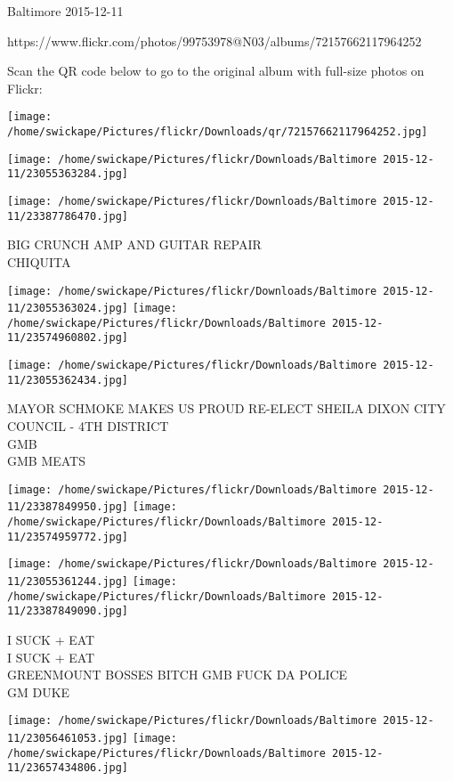 \documentclass[10pt,letterpaper]{article}
\begin{document}
Baltimore 2015-12-11

https://www.flickr.com/photos/99753978@N03/albums/72157662117964252

Scan the QR code below to go to the original album with full-size photos on Flickr:

\texttt{[image: /home/swickape/Pictures/flickr/Downloads/qr/72157662117964252.jpg]}
\pagebreak

\texttt{[image: /home/swickape/Pictures/flickr/Downloads/Baltimore 2015-12-11/23055363284.jpg]}

\vspace{0.25in}
\texttt{[image: /home/swickape/Pictures/flickr/Downloads/Baltimore 2015-12-11/23387786470.jpg]}

BIG CRUNCH AMP AND GUITAR REPAIR\\
CHIQUITA
\pagebreak

\texttt{[image: /home/swickape/Pictures/flickr/Downloads/Baltimore 2015-12-11/23055363024.jpg]}
\texttt{[image: /home/swickape/Pictures/flickr/Downloads/Baltimore 2015-12-11/23574960802.jpg]}

\vspace{0.25in}
\texttt{[image: /home/swickape/Pictures/flickr/Downloads/Baltimore 2015-12-11/23055362434.jpg]}

MAYOR SCHMOKE MAKES US PROUD RE{-}ELECT SHEILA DIXON CITY COUNCIL {-} 4TH DISTRICT\\
GMB\\
GMB MEATS
\pagebreak

\texttt{[image: /home/swickape/Pictures/flickr/Downloads/Baltimore 2015-12-11/23387849950.jpg]}
\texttt{[image: /home/swickape/Pictures/flickr/Downloads/Baltimore 2015-12-11/23574959772.jpg]}

\texttt{[image: /home/swickape/Pictures/flickr/Downloads/Baltimore 2015-12-11/23055361244.jpg]}
\texttt{[image: /home/swickape/Pictures/flickr/Downloads/Baltimore 2015-12-11/23387849090.jpg]}

I SUCK + EAT\\
I SUCK + EAT\\
GREENMOUNT BOSSES BITCH GMB FUCK DA POLICE\\
GM DUKE
\pagebreak

\texttt{[image: /home/swickape/Pictures/flickr/Downloads/Baltimore 2015-12-11/23056461053.jpg]}
\texttt{[image: /home/swickape/Pictures/flickr/Downloads/Baltimore 2015-12-11/23657434806.jpg]}
\end{document}
